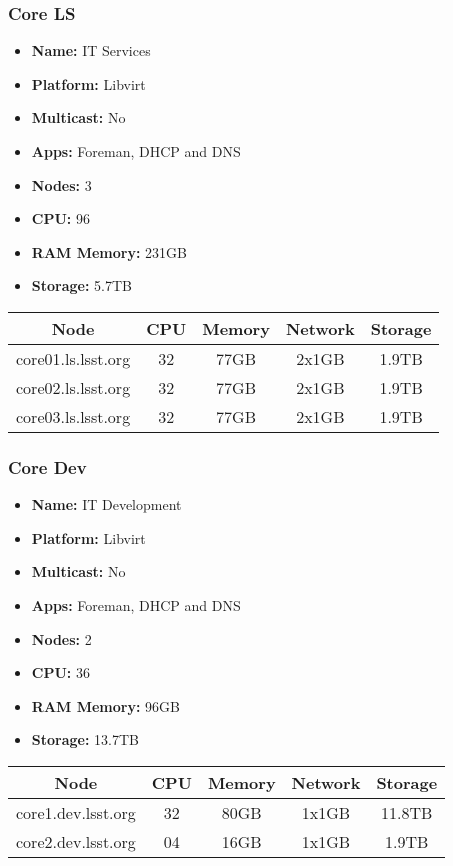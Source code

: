\subsubsection{Core LS}
\begin{itemize}
  \itemsep0em 
  \item \textbf{Name:}      IT Services
  \item \textbf{Platform:}        Libvirt
  \item \textbf{Multicast:}  No
  \item \textbf{Apps:}       Foreman, DHCP and DNS
  \item \textbf{Nodes:}      3
  \item \textbf{CPU:}        96
  \item \textbf{RAM Memory:} 231GB
  \item \textbf{Storage:}   5.7TB
\end{itemize}
\begin{center}
  \small
  \begin{tabular}{||c c c c c||} 
    \hline
    \textbf{Node} & \textbf{CPU} & \textbf{Memory} & \textbf{Network} & \textbf{Storage} \\ [0.5ex]
    \hline
    core01.ls.lsst.org & 32 & 77GB & 2x1GB & 1.9TB \\
    \hline
    core02.ls.lsst.org & 32 & 77GB & 2x1GB & 1.9TB \\
    \hline
    core03.ls.lsst.org & 32 & 77GB & 2x1GB & 1.9TB \\
    \hline
  \end{tabular}
\end{center}

\subsubsection{Core Dev}
\begin{itemize}
  \itemsep0em 
  \item \textbf{Name:}       IT Development
  \item \textbf{Platform:}   Libvirt
  \item \textbf{Multicast:}  No
  \item \textbf{Apps:}       Foreman, DHCP and DNS
  \item \textbf{Nodes:}      2
  \item \textbf{CPU:}        36
  \item \textbf{RAM Memory:} 96GB
  \item \textbf{Storage:}   13.7TB
\end{itemize}
\begin{center}
  \small
  \begin{tabular}{||c c c c c||}
    \hline
    \textbf{Node} & \textbf{CPU} & \textbf{Memory} & \textbf{Network} & \textbf{Storage} \\ [0.5ex]
    \hline
    core1.dev.lsst.org & 32 & 80GB & 1x1GB & 11.8TB \\
    \hline
    core2.dev.lsst.org & 04 & 16GB & 1x1GB & 1.9TB \\
    \hline
  \end{tabular}
\end{center}

